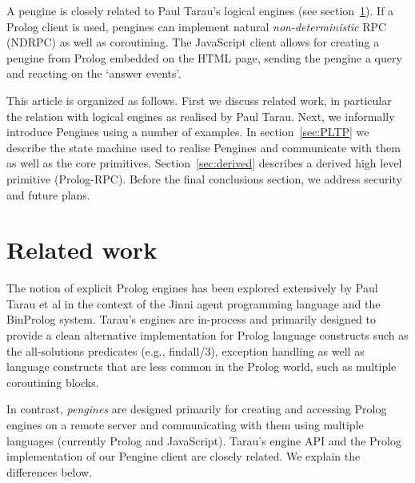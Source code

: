 \documentclass{new_tlp}
\newcommand{\secref}[1]{section~\ref{sec:#1}}
\newcommand{\Secref}[1]{Section~\ref{sec:#1}}
\begin{document}
A pengine is closely related to Paul Tarau's logical engines (see
\secref{related}). If a Prolog client is used, pengines can implement
natural \textit{non-deterministic} RPC (NDRPC) as well as coroutining. The
JavaScript client allows for creating a pengine from Prolog embedded on
the HTML page, sending the pengine a query and reacting on the `answer
events'.

This article is organized as follows. First we discuss related work, in
particular the relation with logical engines as realised by Paul Tarau.
Next, we informally introduce Pengines using a number of examples. In
\secref{PLTP} we describe the state machine used to realise Pengines and
communicate with them as well as the core primitives. \Secref{derived}
describes a derived high level primitive (Prolog-RPC). Before the final
conclusions section, we address security and future plans.


\section{Related work}
\label{sec:related}

The notion of explicit Prolog engines has been explored extensively by
Paul Tarau et al \cite{tarau2009interoperating} in the context of the
Jinni agent programming language and the BinProlog system. Tarau's
engines are in-process and primarily designed to provide a clean
alternative implementation for Prolog language constructs such as the
all-solutions predicates (e.g., findall/3), exception handling as well
as language constructs that are less common in the Prolog world, such as
multiple coroutining blocks.

In contrast, \textit{pengines} are designed primarily for creating and
accessing Prolog engines on a remote server and communicating with them
using multiple languages (currently Prolog and JavaScript).  Tarau's
engine API and the Prolog implementation of our Pengine client are
closely related.  We explain the differences below.
\end{document}
